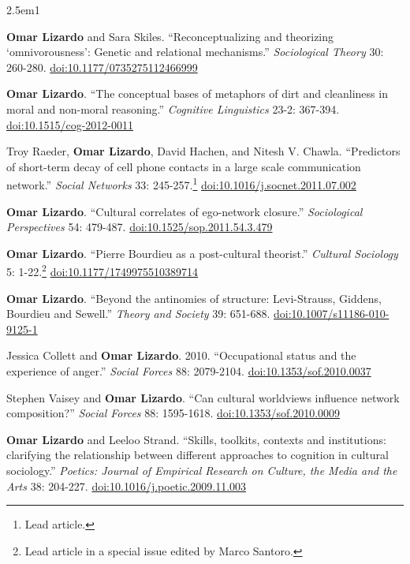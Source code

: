 \documentclass[
]{article}
\newenvironment{cventry}{\begin{hangparas}{2.5em}{1}}{\end{hangparas}}
\begin{document}
\begin{cventry}

\textbf{Omar Lizardo} and Sara Skiles. ``Reconceptualizing and
theorizing `omnivorousness': Genetic and relational mechanisms.''
\emph{Sociological Theory} 30: 260-280.
\href{https://doi.org/10.1177/0735275112466999}{doi:10.1177/0735275112466999}

\textbf{Omar Lizardo}. ``The conceptual bases of metaphors of dirt and
cleanliness in moral and non-moral reasoning.'' \emph{Cognitive
Linguistics} 23-2: 367-394.
\href{https://doi.org/10.1515/cog-2012-0011}{doi:10.1515/cog-2012-0011}

Troy Raeder, \textbf{Omar Lizardo}, David Hachen, and Nitesh V. Chawla.
``Predictors of short-term decay of cell phone contacts in a large scale
communication network.'' \emph{Social Networks} 33: 245-257.\footnote{Lead
  article.}
\href{https://doi.org/10.1016/j.socnet.2011.07.002}{doi:10.1016/j.socnet.2011.07.002}

\textbf{Omar Lizardo}. ``Cultural correlates of ego-network closure.''
\emph{Sociological Perspectives} 54: 479-487.
\href{https://doi.org/10.1525/sop.2011.54.3.479}{doi:10.1525/sop.2011.54.3.479}

\textbf{Omar Lizardo}. ``Pierre Bourdieu as a post-cultural theorist.''
\emph{Cultural Sociology} 5: 1-22.\footnote{Lead article in a special
  issue edited by Marco Santoro.}
\href{https://doi.org/10.1177/1749975510389714}{doi:10.1177/1749975510389714}

\textbf{Omar Lizardo}. ``Beyond the antinomies of structure:
Levi-Strauss, Giddens, Bourdieu and Sewell.'' \emph{Theory and Society}
39: 651-688.
\href{https://doi.org/10.1007/s11186-010-9125-1}{doi:10.1007/s11186-010-9125-1}

Jessica Collett and \textbf{Omar Lizardo}. 2010. ``Occupational status
and the experience of anger.'' \emph{Social Forces} 88: 2079-2104.
\href{https://doi.org/10.1353/sof.2010.0037}{doi:10.1353/sof.2010.0037}

Stephen Vaisey and \textbf{Omar Lizardo}. ``Can cultural worldviews
influence network composition?'' \emph{Social Forces} 88: 1595-1618.
\href{https://doi.org/10.1353/sof.2010.0009}{doi:10.1353/sof.2010.0009}

\textbf{Omar Lizardo} and Leeloo Strand. ``Skills, toolkits, contexts
and institutions: clarifying the relationship between different
approaches to cognition in cultural sociology.'' \emph{Poetics: Journal
of Empirical Research on Culture, the Media and the Arts} 38: 204-227.
\href{https://doi.org/10.1016/j.poetic.2009.11.003}{doi:10.1016/j.poetic.2009.11.003}

\end{cventry}
\end{document}
